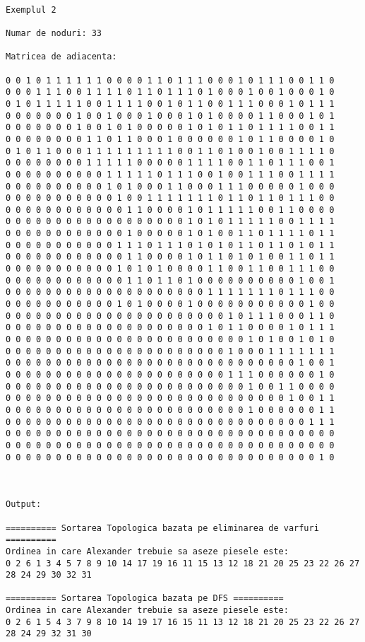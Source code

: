 \documentclass[14pt]{article}
\begin{document}
\begin{lstlisting}

Exemplul 2

Numar de noduri: 33

Matricea de adiacenta:

0 0 1 0 1 1 1 1 1 1 0 0 0 0 1 1 0 1 1 1 0 0 0 1 0 1 1 1 0 0 1 1 0 
0 0 0 1 1 1 0 0 1 1 1 1 0 1 1 0 1 1 1 0 1 0 0 0 1 0 0 1 0 0 0 1 0 
0 1 0 1 1 1 1 1 0 0 1 1 1 1 0 0 1 0 1 1 0 0 1 1 1 0 0 0 1 0 1 1 1 
0 0 0 0 0 0 0 1 0 0 1 0 0 0 1 0 0 0 1 0 1 0 0 0 0 1 1 0 0 0 1 0 1 
0 0 0 0 0 0 0 1 0 0 1 0 1 0 0 0 0 0 1 0 1 0 1 1 0 1 1 1 1 0 0 1 1 
0 0 0 0 0 0 0 0 1 1 0 1 1 0 0 0 1 0 0 0 0 0 0 1 0 1 1 0 0 0 0 1 0 
0 1 0 1 1 0 0 0 1 1 1 1 1 1 1 1 1 0 0 1 1 0 1 0 0 1 0 0 1 1 1 1 0 
0 0 0 0 0 0 0 0 1 1 1 1 1 0 0 0 0 0 1 1 1 1 0 0 1 1 0 1 1 1 0 0 1 
0 0 0 0 0 0 0 0 0 0 1 1 1 1 1 0 1 1 1 0 0 1 0 0 1 1 1 0 0 1 1 1 1 
0 0 0 0 0 0 0 0 0 0 1 0 1 0 0 0 1 1 0 0 0 1 1 1 0 0 0 0 0 1 0 0 0 
0 0 0 0 0 0 0 0 0 0 0 1 0 0 1 1 1 1 1 1 1 0 1 1 0 1 1 0 1 1 1 0 0 
0 0 0 0 0 0 0 0 0 0 0 0 1 1 0 0 0 0 1 0 1 1 1 1 1 0 0 1 1 0 0 0 0 
0 0 0 0 0 0 0 0 0 0 0 0 0 0 0 0 0 0 1 0 1 0 1 1 1 1 1 0 0 1 1 1 1 
0 0 0 0 0 0 0 0 0 0 0 0 1 0 0 0 0 0 1 0 1 0 0 1 1 0 1 1 1 1 0 1 1 
0 0 0 0 0 0 0 0 0 0 0 1 1 1 0 1 1 1 0 1 0 1 0 1 1 0 1 1 0 1 0 1 1 
0 0 0 0 0 0 0 0 0 0 0 0 1 1 0 0 0 0 1 0 1 1 0 1 0 1 0 0 1 1 0 1 1 
0 0 0 0 0 0 0 0 0 0 0 1 0 1 0 1 0 0 0 0 1 1 0 0 1 1 0 0 1 1 1 0 0 
0 0 0 0 0 0 0 0 0 0 0 0 1 1 0 1 1 0 1 0 0 0 0 0 0 0 0 0 0 1 0 0 1 
0 0 0 0 0 0 0 0 0 0 0 0 0 0 0 0 0 0 0 0 1 1 1 1 1 1 1 0 1 1 1 0 0 
0 0 0 0 0 0 0 0 0 0 0 1 0 1 0 0 0 0 1 0 0 0 0 0 0 0 0 0 0 0 1 0 0 
0 0 0 0 0 0 0 0 0 0 0 0 0 0 0 0 0 0 0 0 0 0 1 0 1 1 1 0 0 0 1 1 0 
0 0 0 0 0 0 0 0 0 0 0 0 0 0 0 0 0 0 0 0 1 0 1 1 0 0 0 0 1 0 1 1 1 
0 0 0 0 0 0 0 0 0 0 0 0 0 0 0 0 0 0 0 0 0 0 0 0 1 0 1 0 0 1 0 1 0 
0 0 0 0 0 0 0 0 0 0 0 0 0 0 0 0 0 0 0 0 0 0 1 0 0 0 1 1 1 1 1 1 1 
0 0 0 0 0 0 0 0 0 0 0 0 0 0 0 0 0 0 0 0 0 0 0 0 0 0 0 0 0 1 0 0 1 
0 0 0 0 0 0 0 0 0 0 0 0 0 0 0 0 0 0 0 0 0 0 1 1 1 0 0 0 0 0 0 1 0 
0 0 0 0 0 0 0 0 0 0 0 0 0 0 0 0 0 0 0 0 0 0 0 0 1 0 0 1 1 0 0 0 0 
0 0 0 0 0 0 0 0 0 0 0 0 0 0 0 0 0 0 0 0 0 0 0 0 0 0 0 0 1 0 0 1 1 
0 0 0 0 0 0 0 0 0 0 0 0 0 0 0 0 0 0 0 0 0 0 0 0 1 0 0 0 0 0 0 1 1 
0 0 0 0 0 0 0 0 0 0 0 0 0 0 0 0 0 0 0 0 0 0 0 0 0 0 0 0 0 0 1 1 1 
0 0 0 0 0 0 0 0 0 0 0 0 0 0 0 0 0 0 0 0 0 0 0 0 0 0 0 0 0 0 0 0 0 
0 0 0 0 0 0 0 0 0 0 0 0 0 0 0 0 0 0 0 0 0 0 0 0 0 0 0 0 0 0 0 0 0 
0 0 0 0 0 0 0 0 0 0 0 0 0 0 0 0 0 0 0 0 0 0 0 0 0 0 0 0 0 0 0 1 0 



Output:

========== Sortarea Topologica bazata pe eliminarea de varfuri ==========
Ordinea in care Alexander trebuie sa aseze piesele este: 
0 2 6 1 3 4 5 7 8 9 10 14 17 19 16 11 15 13 12 18 21 20 25 23 22 26 27 28 24 29 30 32 31

========== Sortarea Topologica bazata pe DFS ==========
Ordinea in care Alexander trebuie sa aseze piesele este: 
0 2 6 1 5 4 3 7 9 8 10 14 19 17 16 15 11 13 12 18 21 20 25 23 22 26 27 28 24 29 32 31 30


\end{lstlisting}
\end{document}
